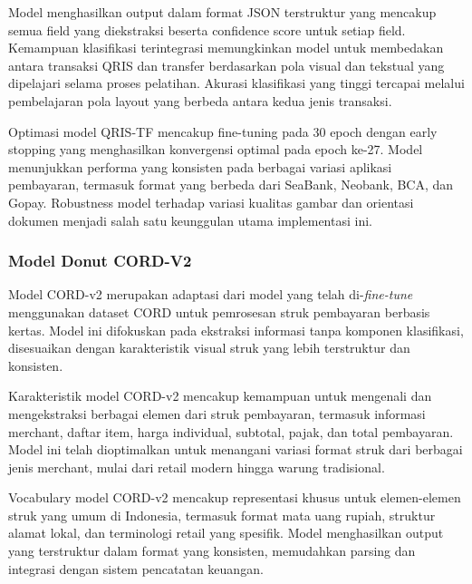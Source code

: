 Model menghasilkan output dalam format JSON terstruktur yang mencakup semua field yang diekstraksi beserta confidence score untuk setiap field. Kemampuan klasifikasi terintegrasi memungkinkan model untuk membedakan antara transaksi QRIS dan transfer berdasarkan pola visual dan tekstual yang dipelajari selama proses pelatihan. Akurasi klasifikasi yang tinggi tercapai melalui pembelajaran pola layout yang berbeda antara kedua jenis transaksi.

Optimasi model QRIS-TF mencakup fine-tuning pada 30 epoch dengan early stopping yang menghasilkan konvergensi optimal pada epoch ke-27. Model menunjukkan performa yang konsisten pada berbagai variasi aplikasi pembayaran, termasuk format yang berbeda dari SeaBank, Neobank, BCA, dan Gopay. Robustness model terhadap variasi kualitas gambar dan orientasi dokumen menjadi salah satu keunggulan utama implementasi ini.

\subsubsection{Model Donut CORD-V2}
\label{subsubsec:model-cord-v2}

Model CORD-v2 merupakan adaptasi dari model \donut{} yang telah di-\emph{fine-tune} menggunakan dataset CORD untuk pemrosesan struk pembayaran berbasis kertas. Model ini difokuskan pada ekstraksi informasi tanpa komponen klasifikasi, disesuaikan dengan karakteristik visual struk yang lebih terstruktur dan konsisten.


Karakteristik model CORD-v2 mencakup kemampuan untuk mengenali dan mengekstraksi berbagai elemen dari struk pembayaran, termasuk informasi merchant, daftar item, harga individual, subtotal, pajak, dan total pembayaran. Model ini telah dioptimalkan untuk menangani variasi format struk dari berbagai jenis merchant, mulai dari retail modern hingga warung tradisional.

Vocabulary model CORD-v2 mencakup representasi khusus untuk elemen-elemen struk yang umum di Indonesia, termasuk format mata uang rupiah, struktur alamat lokal, dan terminologi retail yang spesifik. Model menghasilkan output yang terstruktur dalam format yang konsisten, memudahkan parsing dan integrasi dengan sistem pencatatan keuangan.

